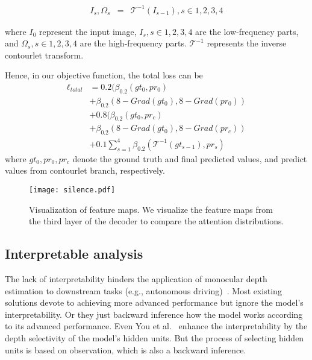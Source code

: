 \documentclass[10pt,times,mathptm,psfig,twocolumn,journals]{IEEEtran}
\begin{document}
\begin{eqnarray}
I_{s}, \Omega_{s} &=& \mathcal{T}^{-1}(I_{s-1}), s\in{1, 2, 3, 4}
\end{eqnarray}

where $I_{0}$ represent the input image, $I_{s}, s\in{1, 2, 3, 4}$ are the low-frequency parts, and $\Omega_{s}, s\in{1, 2, 3, 4}$ are the high-frequency parts. $\mathcal{T}^{-1}$ represents the inverse contourlet transform.


Hence, in our objective function, the total loss can be
\begin{equation}
\begin{split}
\ell_{total} &= 0.2(\beta_{0.2} (gt_{0},pr_{0})\\& + \beta_{0.2} (8-Grad(gt_{0}), 8-Grad(pr_{0})) \\&+ 0.8(\beta_{0.2} (gt_{0},pr_{c}) \\&+ \beta_{0.2} (8-Grad(gt_{0}), 8-Grad(pr_{c})) \\&+ 0.1\sum_{s=1}^{4}\beta_{0.2} (\mathcal{T}^{-1}(gt_{s-1}),pr_{s})\end{split}
\end{equation}
where $gt_{0}, pr_{0}, pr_{c}$ denote the ground truth and final predicted values, and predict values from contourlet branch, respectively.
\begin{figure}[H]
\centering
\texttt{[image: silence.pdf]}
\caption{Visualization of feature maps. We visualize the feature maps from the third layer of the decoder to compare the attention distributions.}
\label{fig:silence}
\end{figure}
\subsection{Interpretable analysis}
\label{Interpretable}
The lack of interpretability hinders the application of monocular depth estimation to downstream tasks (e.g., autonomous driving)~\cite{you2021towards}. Most existing solutions devote to achieving more advanced performance but ignore the model’s interpretability. Or they just backward inference how the model works according to its advanced performance. Even You et al.~\cite{you2021towards} enhance the interpretability by the depth selectivity of the model's hidden units. But the process of selecting hidden units is based on observation, which is also a backward inference.
\end{document}
